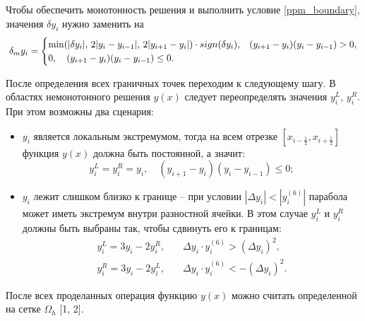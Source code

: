 \documentclass[12pt,a4paper]{article}
\newcommand{\half}{\frac{1}{2}}
\newcommand*{\Scale}[2][4]{\scalebox{#1}{$#2$}}
\begin{document}
    Чтобы обеспечить монотонность решения и выполнить условие \eqref{ppm_boundary}, значения $ \delta y_i $ нужно заменить на 
    \[
        \Scale[0.95] {
            \delta_m y_i = 
            \begin{cases}
                \min(|\delta y_i|,\, 2|y_i - y_{i-1}|,\, 2|y_{i+1} - y_i|)\cdot sign(\delta y_i), & (y_{i+1} - y_i)(y_i - y_{i-1}) > 0, \\
                0, \quad (y_{i+1} - y_i)(y_i - y_{i-1}) \leq 0.
            \end{cases}  
        }
    \]

    После определения всех граничных точек переходим к следующему шагу. В областях немонотонного решения $ y(x) $ следует переопределять значения $ y_i^L,\, y_i^R $. При этом возможны два сценария:
    \begin{itemize}
        \item $ y_i $ является локальным экстремумом, тогда на всем отрезке $ [x_{i-\half}, x_{i+\half}] $ функция $ y(x) $ должна быть постоянной, а значит:
        \begin{equation}
            \label{local_sup}
            y_i^L = y_i^R = y_i, \quad (y_{i+1} - y_i)(y_i - y_{i-1}) \leq 0;
        \end{equation}
                
        \item $ y_i $ лежит слишком близко к границе -- при условии $|\Delta y_i| < | y_i^{(6)} |$ парабола может иметь экстремум внутри разностной ячейки. В этом случае $ y_i^L $ и $ y_i^R $ должны быть выбраны так, чтобы сдвинуть его к границам:
        \begin{equation}
            \label{boundary_sup}
            \begin{split}
                y_i^L = 3y_i -2y_i^R, &\quad \Delta y_i \cdot y_i^{(6)} > (\Delta y_i)^2, \\
                y_i^R = 3y_i -2y_i^L, &\quad \Delta y_i \cdot y_i^{(6)} < -(\Delta y_i)^2.
            \end{split}  
        \end{equation}
    \end{itemize}

    После всех проделанных операция функцию $y(x)$ можно считать определенной на сетке $\Omega_h$ [1, 2]. 
    
\end{document}
